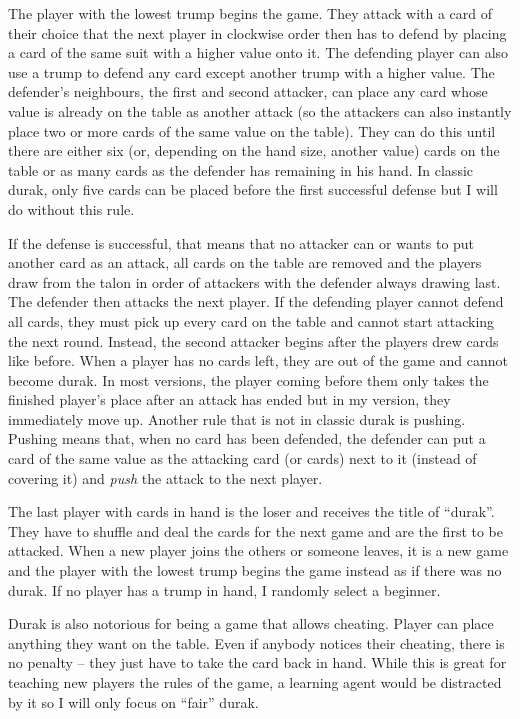 \documentclass[a4paper,titlepage]{article}
\begin{document}
The player with the lowest trump begins the game. They attack with a card of their choice that the next player in clockwise order then has to defend by placing a card of the same suit with a higher value onto it. The defending player can also use a trump to defend any card except another trump with a higher value. The defender's neighbours, the first and second attacker, can place any card whose value is already on the table as another attack (so the attackers can also instantly place two or more cards of the same value on the table). They can do this until there are either six (or, depending on the hand size, another value) cards on the table or as many cards as the defender has remaining in his hand. In classic durak, only five cards can be placed before the first successful defense but I will do without this rule.

If the defense is successful, that means that no attacker can or wants to put another card as an attack, all cards on the table are removed and the players draw from the talon in order of attackers with the defender always drawing last. The defender then attacks the next player.
If the defending player cannot defend all cards, they must pick up every card on the table and cannot start attacking the next round. Instead, the second attacker begins after the players drew cards like before.
When a player has no cards left, they are out of the game and cannot become durak. In most versions, the player coming before them only takes the finished player's place after an attack has ended but in my version, they immediately move up.
Another rule that is not in classic durak is pushing. Pushing means that, when no card has been defended, the defender can put a card of the same value as the attacking card (or cards) next to it (instead of covering it) and \emph{push} the attack to the next player.

The last player with cards in hand is the loser and receives the title of ``durak''. They have to shuffle and deal the cards for the next game and are the first to be attacked. When a new player joins the others or someone leaves, it is a new game and the player with the lowest trump begins the game instead as if there was no durak. If no player has a trump in hand, I randomly select a beginner. \medskip

Durak is also notorious for being a game that allows cheating. Player can place anything they want on the table. Even if anybody notices their cheating, there is no penalty -- they just have to take the card back in hand. While this is great for teaching new players the rules of the game, a learning agent would be distracted by it so I will only focus on ``fair'' durak.
\end{document}
